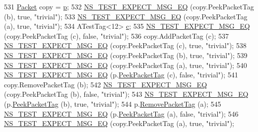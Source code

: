 \begin{DoxyCode}
531     \hyperlink{classns3_1_1Packet}{Packet} copy = \hyperlink{lte__link__budget_8m_ac9de518908a968428863f829398a4e62}{p};
532     \hyperlink{group__testing_ga7304ba46a28d8cf08dfdfd6499cf7068}{NS\_TEST\_EXPECT\_MSG\_EQ} (copy.PeekPacketTag (b), \textcolor{keyword}{true}, \textcolor{stringliteral}{"trivial"});
533     \hyperlink{group__testing_ga7304ba46a28d8cf08dfdfd6499cf7068}{NS\_TEST\_EXPECT\_MSG\_EQ} (copy.PeekPacketTag (a), \textcolor{keyword}{true}, \textcolor{stringliteral}{"trivial"});
534     ATestTag<12> \hyperlink{lte_2model_2fading-traces_2fading__trace__generator_8m_ae0323a9039add2978bf5b49550572c7c}{c};
535     \hyperlink{group__testing_ga7304ba46a28d8cf08dfdfd6499cf7068}{NS\_TEST\_EXPECT\_MSG\_EQ} (copy.PeekPacketTag (c), \textcolor{keyword}{false}, \textcolor{stringliteral}{"trivial"});
536     copy.AddPacketTag (c);
537     \hyperlink{group__testing_ga7304ba46a28d8cf08dfdfd6499cf7068}{NS\_TEST\_EXPECT\_MSG\_EQ} (copy.PeekPacketTag (c), \textcolor{keyword}{true}, \textcolor{stringliteral}{"trivial"});
538     \hyperlink{group__testing_ga7304ba46a28d8cf08dfdfd6499cf7068}{NS\_TEST\_EXPECT\_MSG\_EQ} (copy.PeekPacketTag (b), \textcolor{keyword}{true}, \textcolor{stringliteral}{"trivial"});
539     \hyperlink{group__testing_ga7304ba46a28d8cf08dfdfd6499cf7068}{NS\_TEST\_EXPECT\_MSG\_EQ} (copy.PeekPacketTag (a), \textcolor{keyword}{true}, \textcolor{stringliteral}{"trivial"});
540     \hyperlink{group__testing_ga7304ba46a28d8cf08dfdfd6499cf7068}{NS\_TEST\_EXPECT\_MSG\_EQ} (p.\hyperlink{classns3_1_1Packet_a1734de11f2ca1e78a7872461a0625168}{PeekPacketTag} (c), \textcolor{keyword}{false}, \textcolor{stringliteral}{"trivial"});
541     copy.RemovePacketTag (b);
542     \hyperlink{group__testing_ga7304ba46a28d8cf08dfdfd6499cf7068}{NS\_TEST\_EXPECT\_MSG\_EQ} (copy.PeekPacketTag (b), \textcolor{keyword}{false}, \textcolor{stringliteral}{"trivial"});
543     \hyperlink{group__testing_ga7304ba46a28d8cf08dfdfd6499cf7068}{NS\_TEST\_EXPECT\_MSG\_EQ} (p.\hyperlink{classns3_1_1Packet_a1734de11f2ca1e78a7872461a0625168}{PeekPacketTag} (b), \textcolor{keyword}{true}, \textcolor{stringliteral}{"trivial"});
544     p.\hyperlink{classns3_1_1Packet_a078fe922d976a417ab25ba2f3c2fd667}{RemovePacketTag} (a);
545     \hyperlink{group__testing_ga7304ba46a28d8cf08dfdfd6499cf7068}{NS\_TEST\_EXPECT\_MSG\_EQ} (p.\hyperlink{classns3_1_1Packet_a1734de11f2ca1e78a7872461a0625168}{PeekPacketTag} (a), \textcolor{keyword}{false}, \textcolor{stringliteral}{"trivial"});
546     \hyperlink{group__testing_ga7304ba46a28d8cf08dfdfd6499cf7068}{NS\_TEST\_EXPECT\_MSG\_EQ} (copy.PeekPacketTag (a), \textcolor{keyword}{true}, \textcolor{stringliteral}{"trivial"});

\end{DoxyCode}
